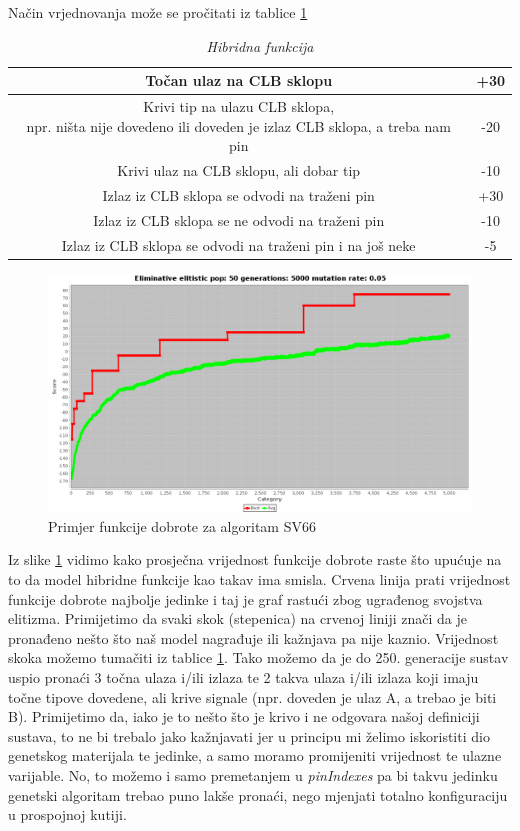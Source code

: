 \documentclass[times, utf8, zavrsni]{fer}
\begin{document}
Način vrjednovanja može se pročitati iz tablice \ref{HibridnaFunkcija}


\begin{table}[htb]
	\caption{\emph{Hibridna funkcija}}
	\label{HibridnaFunkcija}
	\centering
	\begin{tabular}{|c | c|} \hline
		Točan ulaz na CLB sklopu & +30 \\ \hline
		\makecell{Krivi tip na ulazu CLB sklopa, \\ npr. ništa nije dovedeno ili doveden je izlaz CLB sklopa, a treba nam pin} & -20 \\ \hline
		Krivi ulaz na CLB sklopu, ali dobar tip& -10 \\ \hline
		Izlaz iz CLB sklopa se odvodi na traženi pin & +30 \\ \hline
		Izlaz iz CLB sklopa se ne odvodi na traženi pin & -10 \\ \hline 
		Izlaz iz CLB sklopa se odvodi na traženi pin i na još neke & -5
	\end{tabular}
\end{table}

\begin{figure}[!htb]
	\centering
	\includegraphics[width=18cm]{slike/SV66Hibrid.png}
	\caption{Primjer funkcije dobrote za algoritam SV66}
	\label{fig:sv66-alg-hibrid}
\end{figure} 

Iz slike \ref{fig:sv66-alg-hibrid} vidimo kako prosječna vrijednost funkcije dobrote raste što upućuje na to da model hibridne funkcije kao takav ima smisla. Crvena linija prati vrijednost funkcije dobrote najbolje jedinke i taj je graf rastući zbog ugrađenog svojstva elitizma. Primijetimo da svaki skok (stepenica) na crvenoj liniji znači da je pronađeno nešto što naš model nagrađuje ili kažnjava pa nije kaznio. Vrijednost skoka možemo tumačiti iz tablice \ref{HibridnaFunkcija}. Tako možemo da je do 250. generacije sustav uspio pronaći 3 točna ulaza i/ili izlaza te 2 takva ulaza i/ili izlaza koji imaju točne tipove dovedene, ali krive signale (npr. doveden je ulaz A, a trebao je biti B). Primijetimo da, iako je to nešto što je krivo i ne odgovara našoj definiciji sustava, to ne bi trebalo jako kažnjavati jer u principu mi želimo iskoristiti dio genetskog materijala te jedinke, a samo moramo promijeniti vrijednost te ulazne varijable. No, to možemo i samo premetanjem u \emph{pinIndexes} pa bi takvu jedinku genetski algoritam trebao puno lakše pronaći, nego mjenjati totalno konfiguraciju u prospojnoj kutiji. 
\end{document}
